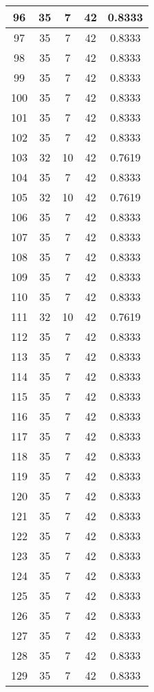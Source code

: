 \documentclass[letterpaper, 12pt]{article}
\begin{document}
\begin{longtable}{|c|c|c|c|c|}
\hline
96 & 35 & 7 & 42 & 0.8333 \\
\hline
97 & 35 & 7 & 42 & 0.8333 \\
\hline
98 & 35 & 7 & 42 & 0.8333 \\
\hline
99 & 35 & 7 & 42 & 0.8333 \\
\hline
100 & 35 & 7 & 42 & 0.8333 \\
\hline
101 & 35 & 7 & 42 & 0.8333 \\
\hline
102 & 35 & 7 & 42 & 0.8333 \\
\hline
103 & 32 & 10 & 42 & 0.7619 \\
\hline
104 & 35 & 7 & 42 & 0.8333 \\
\hline
105 & 32 & 10 & 42 & 0.7619 \\
\hline
106 & 35 & 7 & 42 & 0.8333 \\
\hline
107 & 35 & 7 & 42 & 0.8333 \\
\hline
108 & 35 & 7 & 42 & 0.8333 \\
\hline
109 & 35 & 7 & 42 & 0.8333 \\
\hline
110 & 35 & 7 & 42 & 0.8333 \\
\hline
111 & 32 & 10 & 42 & 0.7619 \\
\hline
112 & 35 & 7 & 42 & 0.8333 \\
\hline
113 & 35 & 7 & 42 & 0.8333 \\
\hline
114 & 35 & 7 & 42 & 0.8333 \\
\hline
115 & 35 & 7 & 42 & 0.8333 \\
\hline
116 & 35 & 7 & 42 & 0.8333 \\
\hline
117 & 35 & 7 & 42 & 0.8333 \\
\hline
118 & 35 & 7 & 42 & 0.8333 \\
\hline
119 & 35 & 7 & 42 & 0.8333 \\
\hline
120 & 35 & 7 & 42 & 0.8333 \\
\hline
121 & 35 & 7 & 42 & 0.8333 \\
\hline
122 & 35 & 7 & 42 & 0.8333 \\
\hline
123 & 35 & 7 & 42 & 0.8333 \\
\hline
124 & 35 & 7 & 42 & 0.8333 \\
\hline
125 & 35 & 7 & 42 & 0.8333 \\
\hline
126 & 35 & 7 & 42 & 0.8333 \\
\hline
127 & 35 & 7 & 42 & 0.8333 \\
\hline
128 & 35 & 7 & 42 & 0.8333 \\
\hline
129 & 35 & 7 & 42 & 0.8333 \\

\end{longtable}
\end{document}
